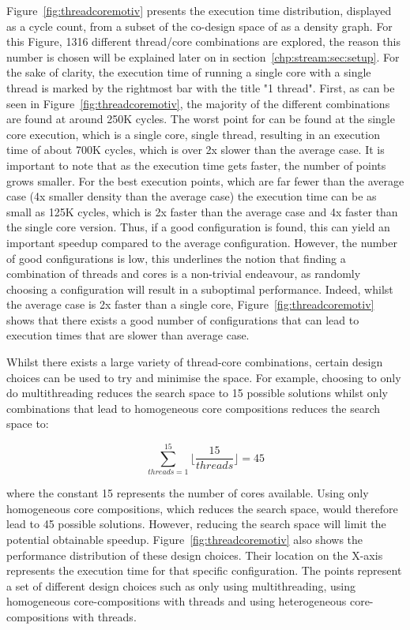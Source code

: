 Figure~\ref{fig:threadcoremotiv} presents the execution time distribution, displayed as a cycle count, from a subset of the co-design space of  as a density graph.
For this Figure, 1316 different thread/core combinations are explored, the reason this number is chosen will be explained later on in section~\ref{chp:stream:sec:setup}.
For the sake of clarity, the execution time of running a single core with a single thread is marked by the rightmost bar with the title "1 thread".
First, as can be seen in Figure~\ref{fig:threadcoremotiv}, the majority of the different combinations are found at around 250K cycles.
The worst point for  can be found at the single core execution, which is a single core, single thread, resulting in an execution time of about 700K cycles, which is over 2x slower than the average case.
It is important to note that as the execution time gets faster, the number of points grows smaller.
For the best execution points, which are far fewer than the average case (4x smaller density than the average case) the execution time can be as small as 125K cycles, which is 2x faster than the average case and 4x faster than the single core version.
Thus, if a good configuration is found, this can yield an important speedup compared to the average configuration.
However, the number of good configurations is low, this underlines the notion that finding a combination of threads and cores is a non-trivial endeavour, as randomly choosing a configuration will result in a suboptimal performance.
Indeed, whilst the average case is 2x faster than a single core, Figure~\ref{fig:threadcoremotiv} shows that there exists a good number of configurations that can lead to execution times that are slower than average case.

Whilst there exists a large variety of thread-core combinations, certain design choices can be used to try and minimise the space.
For example, choosing to only do multithreading reduces the search space to 15 possible solutions whilst only combinations that lead to homogeneous core compositions reduces the search space to:

\begin{equation}
\sum_{threads=1}^{15} \lfloor\frac{15}{threads}\rfloor= 45
\end{equation}

where the constant 15 represents the number of cores available.
Using only homogeneous core compositions, which reduces the search space, would therefore lead to 45 possible solutions.
However, reducing the search space will limit the potential obtainable speedup.
Figure~\ref{fig:threadcoremotiv} also shows the performance distribution of these design choices.
Their location on the X-axis represents the execution time for that specific configuration.
The points represent a set of different design choices such as only using multithreading, using homogeneous core-compositions with threads and using heterogeneous core-compositions with threads.


